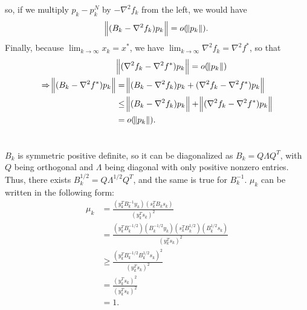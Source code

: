 \documentclass[11pt]{article}
\begin{document}
so, if we multiply $p_k-p_k^N$ by $-\nabla^2 f_k$ from the left, we would have 
\begin{equation}\begin{split}
\norm{(B_k-\nabla^2f_k)p_k} = o(\norm{p_k}).
\end{split}\nonumber\end{equation} 
Finally, because $\lim_{k\to\infty}x_k=x^*$, we have $\lim_{k\to\infty}\nabla^2f_k=\nabla^2f^*$, so that 
\begin{equation}\begin{split}
&\norm{(\nabla^2f_k-\nabla^2f^*)p_k} = o(\norm{p_k}) \\
\Rightarrow \norm{(B_k-\nabla^2f^*)p_k} &= \norm{(B_k-\nabla^2f_k)p_k+(\nabla^2f_k-\nabla^2f^*)p_k} \\
&\leq \norm{(B_k-\nabla^2f_k)p_k} + \norm{(\nabla^2f_k-\nabla^2f^*)p_k} \\
&= o(\norm{p_k}).
\end{split}\nonumber\end{equation}

\section{}
$B_k$ is symmetric positive definite, so it can be diagonalized as $B_k = Q\Lambda Q^T$, with $Q$ being orthogonal and $\Lambda$ being diagonal with only positive nonzero entries. Thus, there exists $B_k^{1/2} = Q\Lambda^{1/2}Q^T$, and the same is true for $B_k^{-1}$. $\mu_k$ can be written in the following form:
\begin{equation}\begin{split} 
\mu_k &= \frac{(y_k^TB_k^{-1}y_k)(s_k^TB_ks_k)}{(y_k^Ts_k)^2} \\
&= \frac{(y_k^TB_k^{-1/2})(B_k^{-1/2}y_k)(s_k^TB_k^{1/2})(B_k^{1/2}s_k)}{(y_k^Ts_k)^2}\\
&\geq\frac{(y_k^TB_k^{-1/2}B_k^{1/2}s_k)^2}{(y_k^Ts_k)^2} \\
&=\frac{(y_k^Ts_k)^2}{(y_k^Ts_k)^2}\\
&=1.
\end{split}\nonumber\end{equation} 
\end{document}
